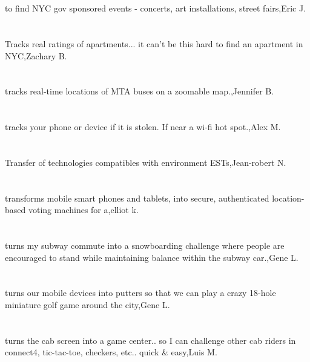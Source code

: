 \section{}to find NYC gov sponsored events - concerts, art installations, street fairs,Eric J.
\section{}Tracks real ratings of apartments... it can't be this hard to find an apartment in NYC,Zachary B.
\section{}tracks real-time locations of MTA buses on a zoomable map.,Jennifer B.
\section{}tracks your phone or device if it is stolen. If near a wi-fi hot spot.,Alex M.
\section{}Transfer of technologies compatibles with environment ESTs,Jean-robert N.
\section{}transforms mobile smart phones and tablets‚ into secure, authenticated location-based voting machines for a,elliot k.
\section{} turns my subway commute into a snowboarding challenge where people are encouraged to stand while maintaining balance within the subway car.,Gene L.
\section{}turns our mobile devices into putters so that we can play a crazy 18-hole miniature golf game around the city,Gene L.
\section{}turns the cab screen into a game center.. so I can challenge other cab riders in connect4, tic-tac-toe, checkers, etc.. quick \& easy,Luis M.

